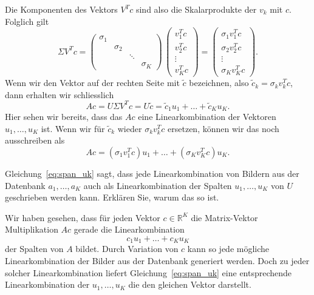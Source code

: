 Die Komponenten des Vektors $V^Tc$ sind also die Skalarprodukte der $v_k$ mit $c$.
Folglich gilt
\begin{equation*}
	\Sigma V^Tc=
	\begin{pmatrix}
		\sigma_1 & & & \\
		& \sigma_2 & & \\
		& & \ddots & \\
		& & & \sigma_K
	\end{pmatrix}\,
	\begin{pmatrix}
		v_1^T c \\
		v_2^T c \\
		\vdots \\
		v_K^T c
	\end{pmatrix}=
	\begin{pmatrix}
		\sigma_1 v_1^T c \\
		\sigma_2 v_2^T c \\
		\vdots \\
		\sigma_K v_K^T c
	\end{pmatrix}.
\end{equation*}
Wenn wir den Vektor auf der rechten Seite mit $\tilde c$ bezeichnen, also $\tilde c_k=\sigma_k v_k^T c$, dann erhalten wir schliesslich
\begin{equation*}
	Ac = U\Sigma V^Tc=U\tilde c
	=\tilde c_1 u_1+\ldots+\tilde c_K u_K.
\end{equation*}
Hier sehen wir bereits, dass das $Ac$ eine Linearkombination der Vektoren $u_1,\ldots,u_K$ ist.
Wenn wir für $\tilde c_k$ wieder $\sigma_k v_k^T c$ ersetzen, können wir das noch ausschreiben als
\begin{equation}\label{eq:span_uk}
	Ac =\left(\sigma_1 v_1^Tc\right) u_1+\ldots+\left(\sigma_K v_K^Tc\right) u_K.
\end{equation}
\begin{aufgabe}
	Gleichung~\eqref{eq:span_uk} sagt, dass jede Linearkombination von Bildern aus der Datenbank $a_1,\ldots,a_K$ auch als Linearkombination der Spalten $u_1,\ldots,u_K$ von $U$ geschrieben werden kann.
	Erklären Sie, warum das so ist.
\end{aufgabe}
\begin{losung}
	Wir haben gesehen, dass für jeden Vektor $c\in\mathbb R^K$ die Matrix-Vektor Multiplikation $Ac$ gerade die Linearkombination
	\begin{equation*}
		c_1u_1+\ldots+c_Ku_K
	\end{equation*}
	der Spalten von $A$ bildet.
	Durch Variation von $c$ kann so jede mögliche Linearkombination der Bilder aus der Datenbank generiert werden.
	Doch zu jeder solcher Linearkombination liefert Gleichung~\eqref{eq:span_uk} eine entsprechende Linearkombination der $u_1,\ldots,u_K$ die den gleichen Vektor darstellt.
\end{losung}
